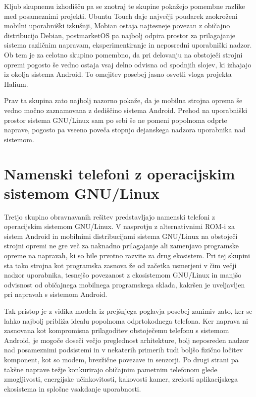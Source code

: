 \documentclass[a4paper,12pt,openright]{book}
\begin{document}
Kljub skupnemu izhodišču pa se znotraj te skupine pokažejo pomembne razlike med posameznimi projekti.
Ubuntu Touch daje največji poudarek zaokroženi mobilni uporabniški izkušnji, Mobian ostaja najtesneje povezan z običajno distribucijo Debian, postmarketOS pa najbolj odpira prostor za prilagajanje sistema različnim napravam, eksperimentiranje in neposredni uporabniški nadzor.
Ob tem je za celotno skupino pomembno, da pri delovanju na obstoječi strojni opremi pogosto še vedno ostaja vsaj delno odvisna od spodnjih slojev, ki izhajajo iz okolja sistema Android.
To omejitev posebej jasno osvetli vloga projekta Halium.

Prav ta skupina zato najbolj nazorno pokaže, da je mobilna strojna oprema še vedno močno zaznamovana z dediščino sistema Android.
Prehod na uporabniški prostor sistema GNU/Linux sam po sebi še ne pomeni popolnoma odprte naprave, pogosto pa vseeno poveča stopnjo dejanskega nadzora uporabnika nad sistemom.

\section{Namenski telefoni z operacijskim sistemom GNU/Linux}
\label{sec:analiza_namenski_gnulinux_telefoni}

Tretjo skupino obravnavanih rešitev predstavljajo namenski telefoni z operacijskim sistemom GNU/Linux.
V nasprotju z alternativnimi ROM-i za sistem Android in mobilnimi distribucijami sistema GNU/Linux na obstoječi strojni opremi ne gre več za naknadno prilagajanje ali zamenjavo programske opreme na napravah, ki so bile prvotno razvite za drug ekosistem.
Pri tej skupini sta tako strojna kot programska zasnova že od začetka usmerjeni v čim večji nadzor uporabnika, tesnejšo povezanost z ekosistemom GNU/Linux in manjšo odvisnost od običajnega mobilnega programskega sklada, kakršen je uveljavljen pri napravah s sistemom Android.

Tak pristop je z vidika modela iz prejšnjega poglavja posebej zanimiv zato, ker se lahko najbolj približa idealu popolnoma odprtokodnega telefona.
Ker naprava ni zasnovana kot kompromisna prilagoditev obstoječemu telefonu s sistemom Android, je mogoče doseči večjo preglednost arhitekture, bolj neposreden nadzor nad posameznimi podsistemi in v nekaterih primerih tudi boljšo fizično ločitev komponent, kot so modem, brezžične povezave in senzorji.
Po drugi strani pa takšne naprave težje konkurirajo običajnim pametnim telefonom glede zmogljivosti, energijske učinkovitosti, kakovosti kamer, zrelosti aplikacijskega ekosistema in splošne vsakdanje uporabnosti.
\end{document}
